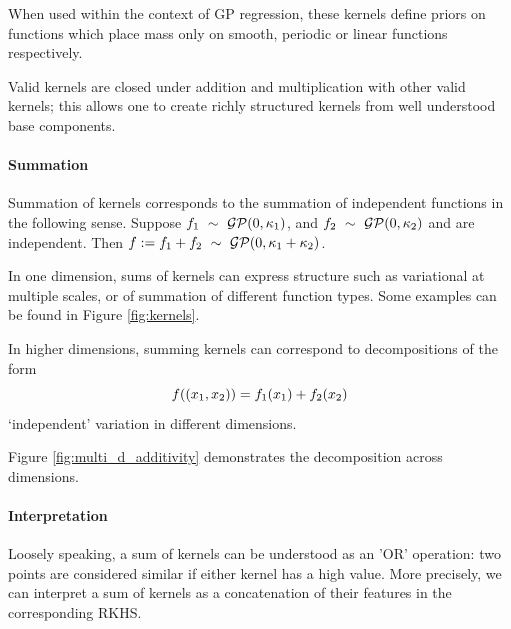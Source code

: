 \documentclass[twoside]{article}
\begin{document}
When used within the context of GP regression, these kernels define priors on functions which place mass only on smooth, periodic or linear functions respectively.

Valid kernels are closed under addition and multiplication with other valid kernels;
this allows one to create richly structured kernels from well understood base components.

%


\paragraph{Summation}

Summation of kernels corresponds to the summation of independent functions in the following sense.
Suppose ${f_1 \ \sim\  \mathcal{GP}(0, \kappa_1)}$, and ${f_2 \ \sim\  \mathcal{GP}(0, \kappa_2)}$ and are independent.
Then ${f := f_1 + f_2 \ \sim\  \mathcal{GP}(0, \kappa_1 + \kappa_2)}$\footnotemark.

In one dimension, sums of kernels can express structure such as variational at multiple scales, or of summation of different function types.  Some examples can be found in Figure \ref{fig:kernels}.

In higher dimensions, summing kernels can correspond to decompositions of the form
\begin{equation}
f((x_1, x_2)) = f_1(x_1) + f_2(x_2)
\end{equation}
\ie `independent' variation in different dimensions.
%

%
Figure \ref{fig:multi_d_additivity} demonstrates the decomposition across dimensions.

\paragraph{Interpretation}
Loosely speaking, a sum of kernels can be understood as an 'OR' operation: two points are considered similar if either kernel has a high value.
More precisely, we can interpret a sum of kernels as a concatenation of their features in the corresponding RKHS.
\end{document}
